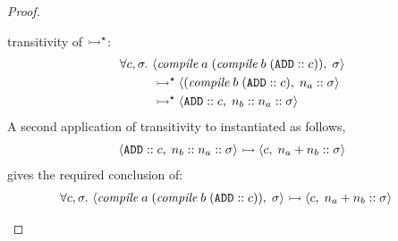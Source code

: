 \begin{proof}
\begin{description}
transitivity of $\rightarrowtail^\star$:
\begin{align*}
	\forall c, \sigma.\
		&\MS<\compile\;a\;(\compile\;b\;(\ADD :: c)), \sigma> \\
	&\ExecS \MS<(\compile\;b\;(\ADD :: c), n_a :: \sigma> \\
	&\ExecS \MS<\ADD :: c, n_b :: n_a :: \sigma>
\end{align*}
A second application of transitivity to  instantiated as
follows,
\begin{gather*}
	\MS<\ADD :: c, n_b :: n_a :: \sigma> \Exec \MS<c, n_a + n_b :: \sigma>
\end{gather*}
gives the required conclusion of:
\begin{align*}
	\forall c, \sigma.\
		&\MS<\compile\;a\;(\compile\;b\;(\ADD :: c)), \sigma>
			\Exec \MS<c, n_a + n_b :: \sigma>
\end{align*}
\end{description}


\end{proof}

